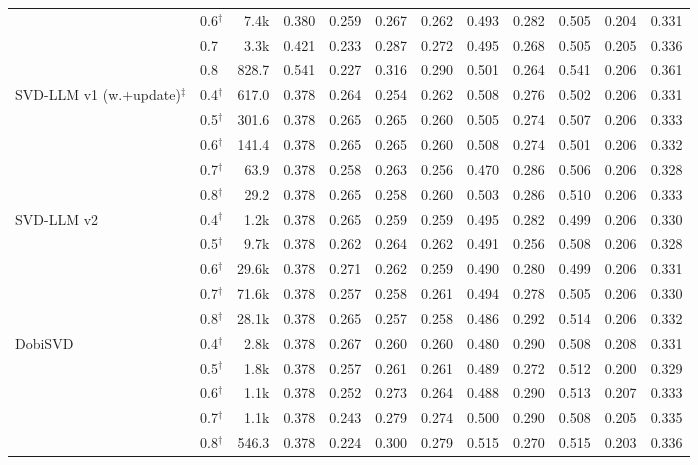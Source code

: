 \begin{table}[t]
\begin{tabular}{llrrrrrrrrrr}
 & 0.6$^{\dagger}$ & 7.4k & 0.380 & 0.259 & 0.267 & 0.262 & 0.493 & 0.282 & 0.505 & 0.204 & 0.331 \\
 & 0.7 & 3.3k & 0.421 & 0.233 & 0.287 & 0.272 & 0.495 & 0.268 & 0.505 & 0.205 & 0.336 \\
 & 0.8 & 828.7 & 0.541 & 0.227 & 0.316 & 0.290 & 0.501 & 0.264 & 0.541 & 0.206 & 0.361 \\
\cmidrule{1-12}
\multirow{5}{*}{SVD-LLM v1 (w.+update)$^{\ddagger}$} & 0.4$^{\dagger}$ & 617.0 & 0.378 & 0.264 & 0.254 & 0.262 & 0.508 & 0.276 & 0.502 & 0.206 & 0.331 \\
 & 0.5$^{\dagger}$ & 301.6 & 0.378 & 0.265 & 0.265 & 0.260 & 0.505 & 0.274 & 0.507 & 0.206 & 0.333 \\
 & 0.6$^{\dagger}$ & 141.4 & 0.378 & 0.265 & 0.265 & 0.260 & 0.508 & 0.274 & 0.501 & 0.206 & 0.332 \\
 & 0.7$^{\dagger}$ & 63.9 & 0.378 & 0.258 & 0.263 & 0.256 & 0.470 & 0.286 & 0.506 & 0.206 & 0.328 \\
 & 0.8$^{\dagger}$ & 29.2 & 0.378 & 0.265 & 0.258 & 0.260 & 0.503 & 0.286 & 0.510 & 0.206 & 0.333 \\
\cmidrule{1-12}
\multirow{5}{*}{SVD-LLM v2} & 0.4$^{\dagger}$ & 1.2k & 0.378 & 0.265 & 0.259 & 0.259 & 0.495 & 0.282 & 0.499 & 0.206 & 0.330 \\
 & 0.5$^{\dagger}$ & 9.7k & 0.378 & 0.262 & 0.264 & 0.262 & 0.491 & 0.256 & 0.508 & 0.206 & 0.328 \\
 & 0.6$^{\dagger}$ & 29.6k & 0.378 & 0.271 & 0.262 & 0.259 & 0.490 & 0.280 & 0.499 & 0.206 & 0.331 \\
 & 0.7$^{\dagger}$ & 71.6k & 0.378 & 0.257 & 0.258 & 0.261 & 0.494 & 0.278 & 0.505 & 0.206 & 0.330 \\
 & 0.8$^{\dagger}$ & 28.1k & 0.378 & 0.265 & 0.257 & 0.258 & 0.486 & 0.292 & 0.514 & 0.206 & 0.332 \\
\cmidrule{1-12}
\multirow{5}{*}{DobiSVD} & 0.4$^{\dagger}$ & 2.8k & 0.378 & 0.267 & 0.260 & 0.260 & 0.480 & 0.290 & 0.508 & 0.208 & 0.331 \\
 & 0.5$^{\dagger}$ & 1.8k & 0.378 & 0.257 & 0.261 & 0.261 & 0.489 & 0.272 & 0.512 & 0.200 & 0.329 \\
 & 0.6$^{\dagger}$ & 1.1k & 0.378 & 0.252 & 0.273 & 0.264 & 0.488 & 0.290 & 0.513 & 0.207 & 0.333 \\
 & 0.7$^{\dagger}$ & 1.1k & 0.378 & 0.243 & 0.279 & 0.274 & 0.500 & 0.290 & 0.508 & 0.205 & 0.335 \\
 & 0.8$^{\dagger}$ & 546.3 & 0.378 & 0.224 & 0.300 & 0.279 & 0.515 & 0.270 & 0.515 & 0.203 & 0.336 \\
\bottomrule
\end{tabular}
\end{table}